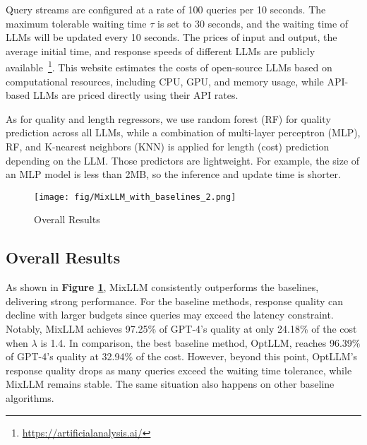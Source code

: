Query streams are configured at a rate of 100 queries per 10 seconds. The maximum tolerable waiting time $\tau$ is set to 30 seconds, and the waiting time of LLMs will be updated every 10 seconds.
The prices of input and output, the average initial time, and response speeds of different LLMs are publicly available~\footnote{\url{https://artificialanalysis.ai/}}.
This website estimates the costs of open-source LLMs based on computational resources, including CPU, GPU, and memory usage, while API-based LLMs are priced directly using their API rates.

As for quality and length regressors, we use random forest (RF) for quality prediction across all LLMs, while a combination of multi-layer perceptron (MLP), RF, and K-nearest neighbors (KNN) is applied for length (cost) prediction depending on the LLM.
Those predictors are lightweight. For example, the size of an MLP model is less than 2MB, so the inference and update time is shorter.



\begin{figure}
\centering
\texttt{[image: fig/MixLLM\_with\_baselines\_2.png]}
\caption{Overall Results
}
\label{mixllm_result}
\end{figure} 

\subsection{Overall Results}
\label{exp_offline}





As shown in \textbf{Figure \ref{mixllm_result}}, MixLLM consistently outperforms the baselines, delivering strong performance. For the baseline methods, response quality can decline with larger budgets since queries may exceed the latency constraint. Notably, MixLLM achieves 97.25\% of GPT-4’s quality at only 24.18\% of the cost when $\lambda$ is 1.4. In comparison, the best baseline method, OptLLM, reaches 96.39\% of GPT-4’s quality at 32.94\% of the cost. However, beyond this point, OptLLM's response quality drops as many queries exceed the waiting time tolerance, while MixLLM remains stable. The same situation also happens on other baseline algorithms.

